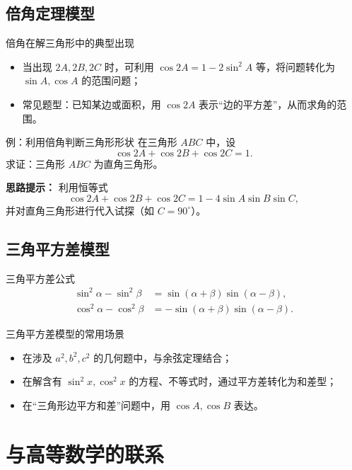 \documentclass[a4paper,11pt]{ctexart}
\begin{document}
\subsection{倍角定理模型}

\begin{summarybox}{倍角在解三角形中的典型出现}
\begin{itemize}
  \item 当出现 $2A,2B,2C$ 时，可利用 $\cos2A=1-2\sin^2A$ 等，将问题转化为 $\sin A,\cos A$ 的范围问题；
  \item 常见题型：已知某边或面积，用 $\cos2A$ 表示“边的平方差”，从而求角的范围。
\end{itemize}
\end{summarybox}

\begin{examplebox}{例：利用倍角判断三角形形状}
在三角形 $ABC$ 中，设
\[
\cos2A+\cos2B+\cos2C = 1.
\]
求证：三角形 $ABC$ 为直角三角形。
\par\textbf{思路提示：} 利用恒等式
\[
\cos2A+\cos2B+\cos2C = 1-4\sin A\sin B\sin C,
\]
并对直角三角形进行代入试探（如 $C=90^\circ$）。
\end{examplebox}

\subsection{三角平方差模型}

\begin{theorembox}{三角平方差公式}
\begin{align*}
\sin^2\alpha - \sin^2\beta &= \sin(\alpha+\beta)\sin(\alpha-\beta),\\
\cos^2\alpha - \cos^2\beta &= -\sin(\alpha+\beta)\sin(\alpha-\beta).
\end{align*}
\end{theorembox}

\begin{summarybox}{三角平方差模型的常用场景}
\begin{itemize}
  \item 在涉及 $a^2,b^2,c^2$ 的几何题中，与余弦定理结合；
  \item 在解含有 $\sin^2x,\cos^2x$ 的方程、不等式时，通过平方差转化为和差型；
  \item 在“三角形边平方和差”问题中，用 $\cos A,\cos B$ 表达。
\end{itemize}
\end{summarybox}

\section{与高等数学的联系}
\label{sec:advanced}
\end{document}
